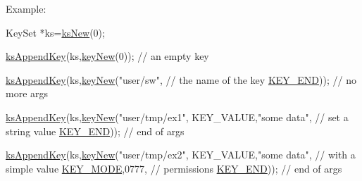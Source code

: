\begin{DoxyParagraph}{Example\-:}

\begin{DoxyCode}
KeySet *ks=\hyperlink{group__keyset_ga671e1aaee3ae9dc13b4834a4ddbd2c3c}{ksNew}(0);

\hyperlink{group__keyset_gaa5a1d467a4d71041edce68ea7748ce45}{ksAppendKey}(ks,\hyperlink{group__key_gaf6893c038b3ebee90c73a9ea8356bebf}{keyNew}(0));       \textcolor{comment}{// an empty key}

\hyperlink{group__keyset_gaa5a1d467a4d71041edce68ea7748ce45}{ksAppendKey}(ks,\hyperlink{group__key_gaf6893c038b3ebee90c73a9ea8356bebf}{keyNew}(\textcolor{stringliteral}{"user/sw"},              \textcolor{comment}{// the name of
       the key}
        \hyperlink{group__key_gga91fb3178848bd682000958089abbaf40aa8adb6fcb92dec58fb19410eacfdd403}{KEY\_END}));                      \textcolor{comment}{// no more args}

\hyperlink{group__keyset_gaa5a1d467a4d71041edce68ea7748ce45}{ksAppendKey}(ks,\hyperlink{group__key_gaf6893c038b3ebee90c73a9ea8356bebf}{keyNew}(\textcolor{stringliteral}{"user/tmp/ex1"},
        KEY\_VALUE,\textcolor{stringliteral}{"some data"},          \textcolor{comment}{// set a string value}
        \hyperlink{group__key_gga91fb3178848bd682000958089abbaf40aa8adb6fcb92dec58fb19410eacfdd403}{KEY\_END}));                      \textcolor{comment}{// end of args}

\hyperlink{group__keyset_gaa5a1d467a4d71041edce68ea7748ce45}{ksAppendKey}(ks,\hyperlink{group__key_gaf6893c038b3ebee90c73a9ea8356bebf}{keyNew}(\textcolor{stringliteral}{"user/tmp/ex2"},
        KEY\_VALUE,\textcolor{stringliteral}{"some data"},          \textcolor{comment}{// with a simple value}
        \hyperlink{group__key_gga91fb3178848bd682000958089abbaf40a1b0a91ff3a855d6993930ebf0abaa518}{KEY\_MODE},0777,                  \textcolor{comment}{// permissions}
        \hyperlink{group__key_gga91fb3178848bd682000958089abbaf40aa8adb6fcb92dec58fb19410eacfdd403}{KEY\_END}));                      \textcolor{comment}{// end of args}


\end{DoxyCode}
\end{DoxyParagraph}
